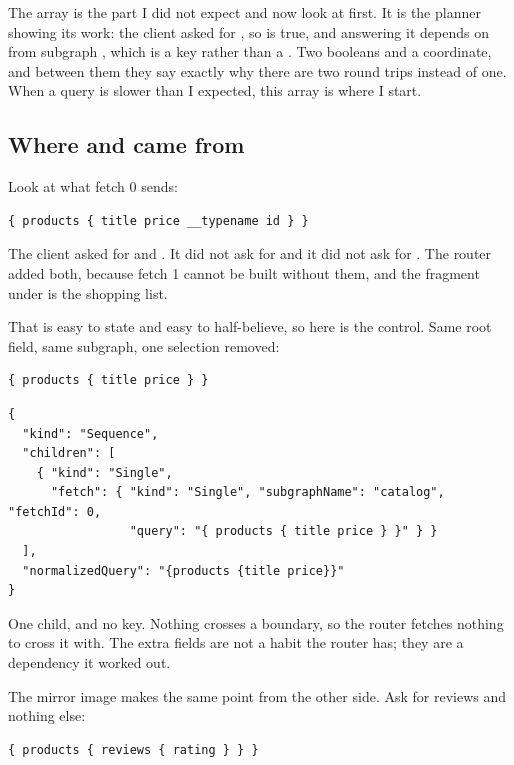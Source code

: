 %
The  array is the part I did not expect and now look at
first. It is the planner showing its work: the client asked for
, so  is true, and answering it
depends on  from subgraph , which is a key rather
than a . Two booleans and a coordinate, and between them they
say exactly why there are two round trips instead of one. When a query is
slower than I expected, this array is where I start.

\subsection*{Where  and  came from}

Look at what fetch 0 sends:

\begin{verbatim}
{ products { title price __typename id } }
\end{verbatim}

The client asked for  and . It did not ask for
 and it did not ask for . The router added both,
because fetch 1 cannot be built without them, and the fragment under
 is the shopping list.

That is easy to state and easy to half-believe, so here is the control. Same
root field, same subgraph, one selection removed:

\begin{verbatim}
{ products { title price } }
\end{verbatim}

\begin{verbatim}
{
  "kind": "Sequence",
  "children": [
    { "kind": "Single",
      "fetch": { "kind": "Single", "subgraphName": "catalog", "fetchId": 0,
                 "query": "{ products { title price } }" } }
  ],
  "normalizedQuery": "{products {title price}}"
}
\end{verbatim}

One child, and no key. Nothing crosses a boundary, so the router fetches nothing
to cross it with. The extra fields are not a habit the router has; they are a
dependency it worked out.

The mirror image makes the same point from the other side. Ask for reviews and
nothing else:

\begin{verbatim}
{ products { reviews { rating } } }
\end{verbatim}

